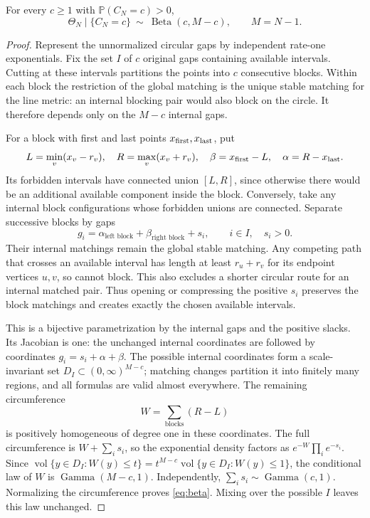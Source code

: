 \documentclass[11pt,letterpaper]{article}
\newcommand{\PP}{\mathbb P}\newcommand{\EE}{\mathbb E}
\newcommand{\Beta}{\operatorname{Beta}}\newcommand{\GammaD}{\operatorname{Gamma}}
\begin{document}
\begin{theorem}\label{thm:beta}
For every $c\ge1$ with $\PP(C_N=c)>0$,
\begin{equation}\label{eq:beta}
 \Theta_N\mid\{C_N=c\}\ \sim\ \Beta(c,M-c),\qquad M=N-1.
\end{equation}
\end{theorem}
\begin{proof}
Represent the unnormalized circular gaps by independent rate-one
exponentials. Fix the set $I$ of $c$ original gaps containing available
intervals. Cutting at these intervals partitions the points into $c$
consecutive blocks. Within each block the restriction of the global matching
is the unique stable matching for the line metric: an internal blocking
pair would also block on the circle. It therefore depends only on the
$M-c$ internal gaps.

For a block with first and last points $x_{\rm first},x_{\rm last}$, put
\[
 L=\min_v(x_v-r_v),\quad R=\max_v(x_v+r_v),\quad
 \beta=x_{\rm first}-L,\quad\alpha=R-x_{\rm last}.
\]
Its forbidden intervals have connected union $[L,R]$, since otherwise
there would be an additional available component inside the block.
Conversely, take any internal block configurations whose forbidden unions
are connected. Separate successive blocks by gaps
\[
 g_i=\alpha_{\text{left block}}+\beta_{\text{right block}}+s_i,
 \qquad i\in I,\quad s_i>0.
\]
Their internal matchings remain the global stable matching. Any competing
path that crosses an available interval has length at least $r_u+r_v$
for its endpoint vertices $u,v$, so cannot block. This also excludes a
shorter circular route for an internal matched pair. Thus opening or
compressing the positive $s_i$ preserves the block matchings and creates
exactly the chosen available intervals.

This is a bijective parametrization by the internal gaps and the positive
slacks. Its Jacobian is one: the unchanged internal coordinates are followed
by coordinates $g_i=s_i+\alpha+\beta$. The possible internal coordinates
form a scale-invariant set $D_I\subset(0,\infty)^{M-c}$; matching changes
partition it into finitely many regions, and all formulas are valid almost
everywhere. The remaining circumference
\[
 W=\sum_{\text{blocks}}(R-L)
\]
is positively homogeneous of degree one in these coordinates. The full
circumference is $W+\sum_i s_i$, so the exponential density factors as
$e^{-W}\prod_i e^{-s_i}$. Since
$\operatorname{vol}\{y\in D_I:W(y)\le t\}=t^{M-c}
\operatorname{vol}\{y\in D_I:W(y)\le1\}$,
the conditional law of $W$ is $\GammaD(M-c,1)$. Independently,
$\sum_i s_i\sim\GammaD(c,1)$. Normalizing the circumference proves
\eqref{eq:beta}. Mixing over the possible $I$ leaves this law unchanged.
\end{proof}
\end{document}
